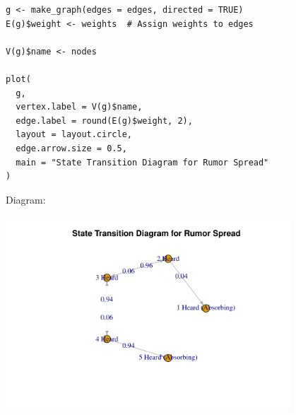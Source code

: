 \documentclass{article}
\begin{document}
\begin{enumerate}
\begin{verbatim}
g <- make_graph(edges = edges, directed = TRUE)
E(g)$weight <- weights  # Assign weights to edges

V(g)$name <- nodes

plot(
  g,
  vertex.label = V(g)$name,
  edge.label = round(E(g)$weight, 2),
  layout = layout.circle,
  edge.arrow.size = 0.5,
  main = "State Transition Diagram for Rumor Spread"
)
\end{verbatim}

Diagram:
\begin{center}
    \includegraphics[width=0.8\textwidth]{HW5_Prob4_Partb.pdf}
\end{center}

\end{enumerate}
\end{document}
